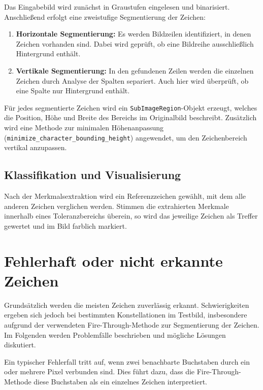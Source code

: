 Das Eingabebild wird zunächst in Graustufen eingelesen und binarisiert. Anschließend erfolgt eine zweistufige Segmentierung der Zeichen:

\begin{enumerate}
  \item \textbf{Horizontale Segmentierung:} Es werden Bildzeilen identifiziert, in denen Zeichen vorhanden sind. Dabei wird geprüft, ob eine Bildreihe ausschließlich Hintergrund enthält.
  \item \textbf{Vertikale Segmentierung:} In den gefundenen Zeilen werden die einzelnen Zeichen durch Analyse der Spalten separiert. Auch hier wird überprüft, ob eine Spalte nur Hintergrund enthält.
\end{enumerate}

Für jedes segmentierte Zeichen wird ein \texttt{SubImageRegion}-Objekt erzeugt, welches die Position, Höhe und Breite des Bereichs im Originalbild beschreibt. Zusätzlich wird eine Methode zur minimalen Höhenanpassung (\texttt{minimize\_character\_bounding\_height}) angewendet, um den Zeichenbereich vertikal anzupassen.

\subsection{Klassifikation und Visualisierung}

Nach der Merkmalsextraktion wird ein Referenzzeichen gewählt, mit dem alle anderen Zeichen verglichen werden. Stimmen die extrahierten Merkmale innerhalb eines Toleranzbereichs überein, so wird das jeweilige Zeichen als Treffer gewertet und im Bild farblich markiert.



\section{Fehlerhaft oder nicht erkannte Zeichen}


Grundsätzlich werden die meisten Zeichen zuverlässig erkannt. Schwierigkeiten ergeben sich jedoch bei bestimmten Konstellationen im Testbild, insbesondere aufgrund der verwendeten Fire-Through-Methode zur Segmentierung der Zeichen. Im Folgenden werden Problemfälle beschrieben und mögliche Lösungen diskutiert.

Ein typischer Fehlerfall tritt auf, wenn zwei benachbarte Buchstaben durch ein oder mehrere Pixel verbunden sind. Dies führt dazu, dass die Fire-Through-Methode diese Buchstaben als ein einzelnes Zeichen interpretiert. 

